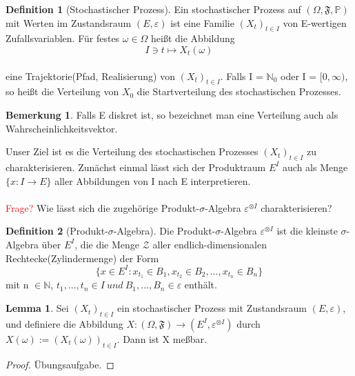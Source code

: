 \documentclass[a4paper,12pt]{scrartcl}
\theoremstyle{definition}
\newtheorem{lemi}{Lemma}[section]
\newtheorem{bem}{Bemerkung}[section]
\newtheorem{defi}{Definition}[section]
\begin{document}
\begin{defi}[Stochastischer Prozess]
Ein stochastischer Prozess auf $(\Omega, \mathfrak{F}, \mathbb{P})$ mit Werten im Zustandsraum $(E, \varepsilon)$ ist eine Familie $(X_{t})_{t\in I}$ von E-wertigen Zufallsvariablen. Für festes $\omega \in \Omega$ heißt die Abbildung
\\
\begin{equation*}
I \ni t \mapsto X_{t}(\omega)
\end{equation*}
\\
eine Trajektorie(Pfad, Realisierung) von $(X_{t})_{t\in I}$. Falls I = $\mathbb{N}_{0}$ oder I = $[0,\infty)$, so heißt die Verteilung von $X_{0}$ die Startverteilung des stochastischen Prozesses.
\end{defi}
\begin{bem}
Falls E diskret ist, so bezeichnet man eine Verteilung auch als Wahrscheinlichkeitsvektor.
\end{bem} 
\noindent 
Unser Ziel ist es die Verteilung des stochastischen Prozesses $(X_{t})_{t\in I}$ zu charakterisieren. Zunächst einmal lässt sich der Produktraum $E^{I}$ auch als Menge $\lbrace x: I \to E\rbrace$ aller Abbildungen von I nach E interpretieren. 
\\
\\
\textcolor{red}{Frage?} Wie lässt sich die zugehörige Produkt-$\sigma$-Algebra $\varepsilon^{ \otimes I}$ charakterisieren?
\begin{defi}[Produkt-$\sigma$-Algebra]
Die Produkt-$\sigma$-Algebra $\varepsilon^{ \otimes I}$ ist die kleinste $\sigma$-Algebra über $E^{I}$, die die Menge $\mathcal{Z}$ aller endlich-dimensionalen Rechtecke(Zylindermenge) der Form
\begin{equation*}
\lbrace x \in E^{I} : x_{t_{1}} \in B_{1}, x_{t_{2}} \in B_{2},..., x_{t_{n}} \in B_{n}   \rbrace 
\end{equation*}
mit n $\in \mathbb{N}$, $t_{1},..., t_{n} \in I \: und \:B_{1},...,B_{n} \in \varepsilon $ enthält.
\end{defi}

\begin{lemi}
Sei $(X_{t})_{t\in I}$ ein stochastischer Prozess mit Zustandsraum $(E,\varepsilon)$, und definiere die Abbildung $X:(\Omega,\mathfrak{F}) \to (E^{I},\varepsilon^{ \otimes I})$ durch $X(\omega) := (X_{t}(\omega))_{t\in I} $. 
Dann ist X meßbar. 
\end{lemi}
\begin{proof}
Übungsaufgabe.
\end{proof}
\noindent 
\end{document}
